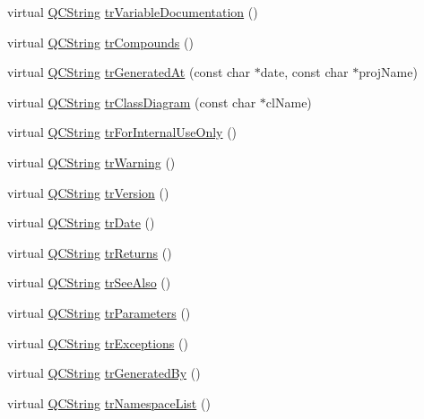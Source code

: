 \begin{DoxyCompactItemize}
\item 
virtual \hyperlink{class_q_c_string}{Q\-C\-String} \hyperlink{class_translator_slovak_aa3ed4d30194d5ad2ae633df2d91e4bcd}{tr\-Variable\-Documentation} ()
\item 
virtual \hyperlink{class_q_c_string}{Q\-C\-String} \hyperlink{class_translator_slovak_a603472da4b3038d38d1f322fa07c580e}{tr\-Compounds} ()
\item 
virtual \hyperlink{class_q_c_string}{Q\-C\-String} \hyperlink{class_translator_slovak_a4fdf6d63541eaaa48cd09fd9ffdf2bec}{tr\-Generated\-At} (const char $\ast$date, const char $\ast$proj\-Name)
\item 
virtual \hyperlink{class_q_c_string}{Q\-C\-String} \hyperlink{class_translator_slovak_a5650582c9e4157837fa0a32b75772947}{tr\-Class\-Diagram} (const char $\ast$cl\-Name)
\item 
virtual \hyperlink{class_q_c_string}{Q\-C\-String} \hyperlink{class_translator_slovak_afd682dc33a99dbe52d3d56cace1a4378}{tr\-For\-Internal\-Use\-Only} ()
\item 
virtual \hyperlink{class_q_c_string}{Q\-C\-String} \hyperlink{class_translator_slovak_a30dfe9a37c224d94a44acf885cfec685}{tr\-Warning} ()
\item 
virtual \hyperlink{class_q_c_string}{Q\-C\-String} \hyperlink{class_translator_slovak_a4c159562e29fe27461d720f6b85c6f7e}{tr\-Version} ()
\item 
virtual \hyperlink{class_q_c_string}{Q\-C\-String} \hyperlink{class_translator_slovak_a715c7be3c49c9d5aba58e4b64cc6c00b}{tr\-Date} ()
\item 
virtual \hyperlink{class_q_c_string}{Q\-C\-String} \hyperlink{class_translator_slovak_ab5d8a97c3f20037cac764de958bd65e7}{tr\-Returns} ()
\item 
virtual \hyperlink{class_q_c_string}{Q\-C\-String} \hyperlink{class_translator_slovak_af0d165ede50aabbbdc9db316e370251f}{tr\-See\-Also} ()
\item 
virtual \hyperlink{class_q_c_string}{Q\-C\-String} \hyperlink{class_translator_slovak_a8955ee9ef9b45851d24617e2d5042038}{tr\-Parameters} ()
\item 
virtual \hyperlink{class_q_c_string}{Q\-C\-String} \hyperlink{class_translator_slovak_a97ca33ee6650968ebd891277ee0575dc}{tr\-Exceptions} ()
\item 
virtual \hyperlink{class_q_c_string}{Q\-C\-String} \hyperlink{class_translator_slovak_aa0426688896bb55b4980890f1cc6aa76}{tr\-Generated\-By} ()
\item 
virtual \hyperlink{class_q_c_string}{Q\-C\-String} \hyperlink{class_translator_slovak_ae958060c87ca1439cfe719469641a0b8}{tr\-Namespace\-List} ()

\end{DoxyCompactItemize}
